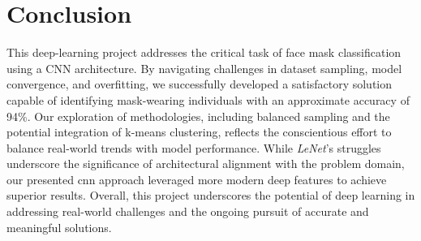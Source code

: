 \documentclass{article}
\begin{document}
\section{Conclusion}

This deep-learning project addresses the critical task of face mask classification using a CNN architecture. 
By navigating challenges in dataset sampling, model convergence, and overfitting, we successfully developed a satisfactory solution capable of identifying mask-wearing individuals with an approximate accuracy of 94\%. Our exploration of methodologies, including balanced sampling and the potential integration of k-means clustering, reflects the conscientious effort to balance real-world trends with model performance. While \textit{LeNet}'s struggles underscore the significance of architectural alignment with the problem domain, our presented \gls{cnn} approach leveraged more modern deep features to achieve superior results. Overall, this project underscores the potential of deep learning in addressing real-world challenges and the ongoing pursuit of accurate and meaningful solutions.

\printbibliography
\end{document}
